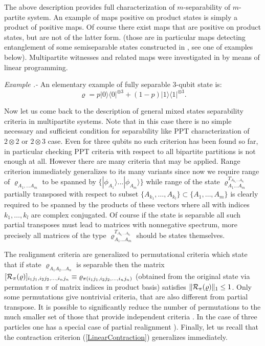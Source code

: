 \documentclass[rmp,12pt,preprint]{revtex4-2}
\begin{document}
The above description provides full characterization of
$m$-separability of $m$-partite system.  An example of maps positive
on product states is simply a product of positive maps. Of course
there exist maps that are positive on product states, but are not of
the latter form.  (those are in particular maps \cite{multisep}
detecting entanglement of some semiseparable states constructed in
\cite{BennettUPBI1999}, see one of examples below). Multipartite witnesses
and related maps were investigated in \cite{JafarizadehNH2006-wit}
by means of linear programming.

{\it Example .- } An elementary example of fully separable $3$-qubit
state is:
\begin{equation}
\varrho=p|0\rangle \langle 0|^{\otimes 3}+ (1-p)|1\rangle \langle
1|^{\otimes 3}.
\end{equation}

Now let us come back to the description of general mixed states
separability criteria in multipartite systems. Note that in this case
there is no simple necessary and sufficient condition for separability
like PPT characterization of $2 \otimes 2$ or $2 \otimes 3$ case. Even
for three qubits no such criterion has been found so far, in
particular checking PPT criteria with respect to all bipartite
partitions is not enough at all. However there are many criteria that
may be applied. Range criterion immediately generalizes to its many
variants since now we require range of $\varrho_{A_{1},...A_{m}}$ to
be spanned by $\{ |\phi_{A_1}\rangle...|\phi_{A_m}\rangle \}$ while
range of the state $\varrho_{A_{1}...A_{m}}^{T_{ A_{k_1}... A_{k_l}
  }}$ partially transposed with respect to subset $\{
A_{k_1},\ldots,A_{k_l} \} \subset \{ A_{1},\ldots,A_{m} \} $ is
clearly required to be spanned by the products of these vectors where
all with indices $k_1, \ldots, k_l$ are complex conjugated. Of course
if the state is separable all such partial transposes must lead to
matrices with nonnegative spectrum, more precisely all matrices of the
type $\varrho_{A_{1}...A_{m}}^{T_{ A_{k_1}... A_{k_l} }}$ should be
states themselves.

The realignment criteria are generalized to permutational criteria
\cite{HHH02-permut,ChenW2002-pla} which state that if state
$\varrho_{A_1A_2 ... A_n}$ is separable then the matrix $[{\cal
  R}_{\pi}(\varrho)]_{i_{1}j_{1},i_{2}j_{2},\ldots,i_{n}j_{n}}\equiv
{\varrho}_{\pi(i_{1}j_{1},i_{2}j_{2},\ldots,i_{n}j_{n})}$ (obtained
from the original state via permutation $\pi$ of matrix indices in
product basis) satisfies $\|{\cal R}_{\pi}(\varrho)\|_1\leq 1$.
Only some permutations give nontrivial criteria, that are also
different from partial transpose. It is possible to significantly
reduce the number of permutations to the much smaller set of those
that provide independent criteria \cite{HorodeckiWocjan}. In the case
of three particles one has a special case of partial realignment
\cite{HHH02-permut,ChenWu}).  Finally, let us recall that the
contraction criterion (\ref{LinearContraction}) generalizes
immediately.
\end{document}
